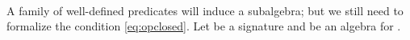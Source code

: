 \begin{code}
\>[0]\AgdaSpace{}%
\AgdaSymbol{:}\AgdaSpace{}%
\AgdaSymbol{(}\AgdaSpace{}%
\AgdaSymbol{:}\AgdaSpace{}%
\AgdaSymbol{)}\AgdaSpace{}%
\AgdaSpace{}%
\AgdaSymbol{(}
\AgdaSpace{}\AgdaSymbol{:}
\AgdaSpace{}\AgdaSpace{}%
\AgdaSpace{}\AgdaSpace{}
\AgdaSpace{}
\AgdaSymbol{)}
\AgdaSpace{}%
\<%
\\
\>[0]\AgdaSpace{}%
\AgdaSpace{}%
\AgdaSpace{}%
\AgdaSymbol{=}\AgdaSpace{}%
\AgdaSpace{}%
\AgdaSymbol{\{}
\AgdaSpace{}%
\AgdaSpace{}%
\AgdaSpace{}%
\AgdaSymbol{\}}\AgdaSpace{}%
\AgdaSpace{}%
\AgdaSpace{}%
\AgdaSpace{}%
\AgdaSpace{}%
\AgdaSpace{}%
\AgdaSpace{}%
\AgdaSpace{}%
\AgdaSpace{}%
\<%
\end{code} 

\noindent A family of well-defined predicates will induce a subalgebra;
but we still need to formalize the condition \eqref{eq:opclosed}.  Let
 be a signature and  be an algebra for .

